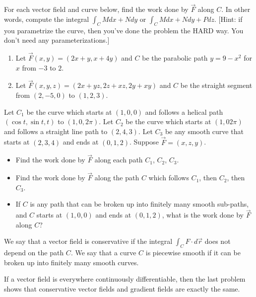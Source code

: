 \begin{problem}
%
For each vector field and curve below, find the work done by $\vec F$ along $C$. In other words, compute the integral $\int_C Mdx+Ndy$ or $\int_C Mdx+Ndy+Pdz$. [Hint: if you parametrize the curve, then you've done the problem the HARD way. You don't need any parameterizations.]
\begin{enumerate}
 \item Let $\vec F(x,y) = (2x+y,x+4y)$ and $C$ be the parabolic path $y=9-x^2$ for $x$ from $-3$ to $2$. 
 \item Let $\vec F(x,y,z) = (2x+yz,2z+xz,2y+xy)$ and $C$ be the straight segment from $(2,-5,0)$ to $(1,2,3)$. 
\end{enumerate}
\end{problem}

\begin{problem}
 Let $C_1$ be the curve which starts at $(1,0,0)$ and follows a helical path $(\cos t, \sin t, t)$ to  $(1,0,2\pi)$. Let $C_2$ be the curve which starts at $(1,0 2\pi)$ and follows a straight line path to $(2,4,3)$. Let $C_3$ be any smooth curve that starts at $(2,3,4)$ and ends at $(0,1,2)$.  Suppose $\vec F = (x,z,y)$.
 \begin{itemize}
  \item Find the work done by $\vec F$ along each path $C_1$, $C_2$, $C_3$. 
  \item Find the work done by $\vec F$ along the path $C$ which follows $C_1$, then $C_2$, then $C_3$.  
  \item If $C$ is any path that can be broken up into finitely many smooth sub-paths, and $C$ starts at $(1,0,0)$ and ends at $(0,1,2)$, what is the work done by $\vec F$ along $C$?
 \end{itemize}
\end{problem}

\begin{definition}
 We say that a vector field is conservative if the integral $\int_C F\cdot d\vec r$ does not depend on the path $C$. We say that a curve $C$ is piecewise smooth if it can be broken up into finitely many smooth curves.
\end{definition}
 If a vector field is everywhere continuously differentiable, then the last problem shows that conservative vector fields and gradient fields are exactly the same.

